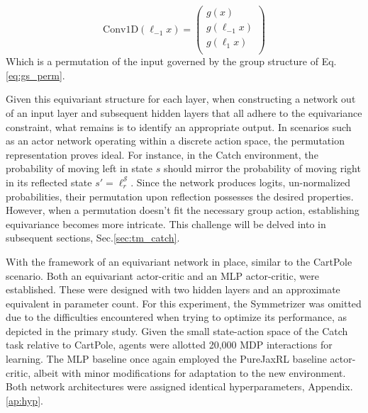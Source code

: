 \begin{equation}
	\text{Conv1D}(\ell_{-1} x) = \begin{pmatrix}
		g(x)          \\
		g(\ell_{-1}x) \\
		g(\ell_{1}x)  \\
	\end{pmatrix}
\end{equation}
Which is a permutation of the input governed by the group structure of Eq.\ref{eq:gs_perm}.

Given this equivariant structure for each layer, when constructing a network out of an input layer and subsequent hidden layers that all adhere to the equivariance constraint, what remains is to identify an appropriate output. In scenarios such as an actor network operating within a discrete action space, the permutation representation proves ideal. For instance, in the Catch environment, the probability of moving left in state \( s \) should mirror the probability of moving right in its reflected state \( s' = \ell_r^\mathcal{S} \). Since the network produces logits, un-normalized probabilities, their permutation upon reflection possesses the desired properties. However, when a permutation doesn't fit the necessary group action, establishing equivariance becomes more intricate. This challenge will be delved into in subsequent sections, Sec.\ref{sec:tm_catch}.

With the framework of an equivariant network in place, similar to the CartPole scenario. Both an equivariant actor-critic and an MLP actor-critic, were established. These were designed with two hidden layers and an approximate equivalent in parameter count. For this experiment, the Symmetrizer was omitted due to the difficulties encountered when trying to optimize its performance, as depicted in the primary study. Given the small state-action space of the Catch task relative to CartPole, agents were allotted 20,000 MDP interactions for learning. The MLP baseline once again employed the PureJaxRL baseline actor-critic, albeit with minor modifications for adaptation to the new environment. Both network architectures were assigned identical hyperparameters, Appendix.\ref{ap:hyp}.

